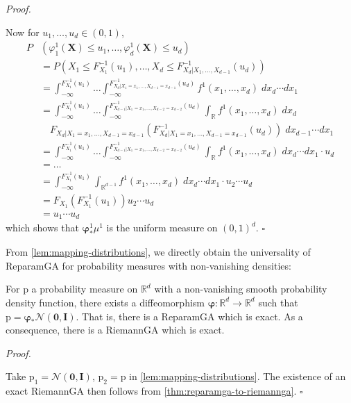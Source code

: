 \documentclass[runningheads,orivec]{llncs}
\newcommand{\R}{\mathbb R}
\newcommand{\inv}{^{-1}}
\newenvironment{proof}[1][Proof]{%
    \par\noindent\textit{#1. }%
    \ignorespaces
}{%
    \hfill$\square$ %
    \par
}
\begin{document}
\begin{proof}
    Now for $u_1,\dots,u_d\in(0,1)$,
    \begin{align*}
        P&(\varphi_1^1(\bm X) \leq u_1,\dots,\varphi_d^1(\bm X) \leq u_d) \\
        &= P\left(X_1\leq F\inv_{X_1}(u_1),\dots,X_d\leq F\inv_{X_d|X_1,\dots,X_{d-1}}(u_d)\right) \\
        &= \int_{-\infty}^{F\inv_{X_1}(u_1)}\dots\int_{-\infty}^{F\inv_{X_d|X_1=x_1,\dots,X_{d-1}=x_{d-1}}(u_d)}f^1(x_1,\dots,x_d)\;dx_d\cdots dx_1 \\
        &= \int_{-\infty}^{F\inv_{X_1}(u_1)}\dots\int_{-\infty}^{F\inv_{X_{d-1}|X_1=x_1,\dots,X_{d-2}=x_{d-2}}(u_d)}\int_\R f^1(x_1,\dots,x_d)\;dx_d\\
        &\quad F_{X_d|X_1=x_1,\dots, X_{d-1}=x_{d-1}}\left(F\inv_{X_d|X_1=x_1,\dots, X_{d-1}=x_{d-1}}(u_d)\right)\;dx_{d-1} \cdots dx_1 \\
        &= \int_{-\infty}^{F\inv_{X_1}(u_1)}\dots\int_{-\infty}^{F\inv_{X_{d-1}|X_1=x_1,\dots,X_{d-2}=x_{d-2}}(u_d)}\int_\R f^1(x_1,\dots,x_d)\;dx_d\cdots dx_1 \cdot u_d \\
        &= \dots \\
        &= \int_{-\infty}^{F_{X_1}\inv(u_1)}\int_{\R^{d-1}}f^1(x_1,\dots,x_d)\;dx_d\cdots dx_1 \cdot u_2\cdots u_d \\
        &= F_{X_1}\left(F_{X_1}\inv(u_1)\right)u_2\cdots u_d \\
        &= u_1\cdots u_d
    \end{align*}
    which shows that $\bm\varphi^1_*\mu^1$ is the uniform measure on $(0,1)^d$.
\end{proof}

From \cref{lem:mapping-distributions}, we directly obtain the universality of ReparamGA for probability measures with non-vanishing densities:
\begin{theorem}\label{thm:universality}
    For $\mathrm p$ a probability measure on $\R^d$ with a non-vanishing smooth probability density function, there exists a diffeomorphism $\bm \varphi\colon \R^d \to \R^d$ such that $\mathrm p = \bm\varphi_* \mathcal N(\bm 0, \bm I)$. That is, there is a ReparamGA which is exact. As a consequence, there is a RiemannGA which is exact.
\end{theorem}
\begin{proof}
    Take $\mathrm p_1 = \mathcal N(\bm 0,\bm I)$, $\mathrm p_2 = \mathrm p$ in \cref{lem:mapping-distributions}. The existence of an exact RiemannGA then follows from \cref{thm:reparamga-to-riemannga}.
\end{proof}
\end{document}
